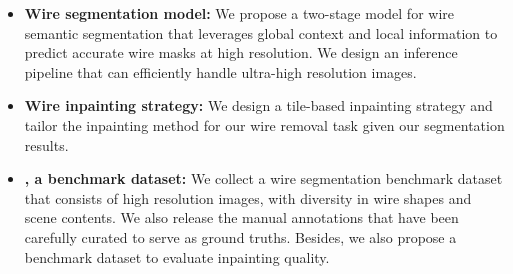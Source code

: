 \begin{itemize}[noitemsep]
  \item \textbf{Wire segmentation model:} We propose a two-stage model for wire semantic segmentation that leverages global context and local information to predict accurate wire masks at high resolution. We design an inference pipeline that can efficiently handle ultra-high resolution images.
  \item \textbf{Wire inpainting strategy:} We design a tile-based inpainting strategy and tailor the inpainting method for our wire removal task given our segmentation results.
  \item \textbf{\benchmark, a benchmark dataset:} We collect a wire segmentation benchmark dataset that consists of high resolution images, with diversity in wire shapes and scene contents. We also release the manual annotations that have been carefully curated to serve as ground truths. Besides, we also propose a benchmark dataset to evaluate inpainting quality. 
\end{itemize}


